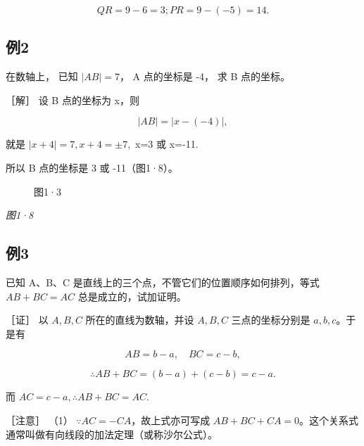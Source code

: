 \[
QR = 9 - 6 = 3; PR = 9 - (- 5) = 14.
\]

\subsection{例2}\label{ux4f8b2}

在数轴上， 已知 \(\left|AB\right|=7\)， A 点的坐标是 -4， 求 B
点的坐标。

［解］ 设 B 点的坐标为 x，则

\[
\vert AB \vert = \vert x - (- 4) \vert,
\]

就是 \(|x + 4| = 7, x + 4 = \pm 7,\) x=3 或 x=-11.

所以 B 点的坐标是 3 或 -11（图1·8）。

\begin{figure}
\centering
{}
\caption{图1·3}
\end{figure}

\emph{图1·8}

\subsection{例3}\label{ux4f8b3}

已知 A、B、C 是直线上的三个点，不管它们的位置顺序如何排列，等式
\(AB+BC=AC\) 总是成立的，试加证明。

［证］ 以 \(A, B, C\) 所在的直线为数轴，并设 \(A, B, C\)
三点的坐标分别是 \(a, b, c\)。于是有

\[
AB = b - a, \quad BC = c - b,
\]

\[
\therefore AB + BC = (b - a) + (c - b) = c - a.
\]

而 \(AC = c - a, \therefore AB + BC = AC.\)

［注意］ （1） \(\because AC = -CA\)，故上式亦可写成
\(AB + BC + CA = 0\)。这个关系式通常叫做有向线段的加法定理（或称沙尔公式）。

